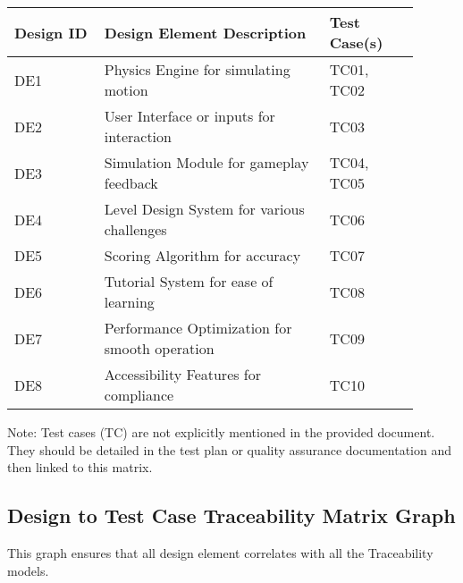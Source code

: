 \documentclass[12pt]{article}
\begin{document}
\begin{longtable}{|p{0.2\linewidth}|p{0.5\linewidth}|p{0.2\linewidth}|}
\hline
\textbf{Design ID} & \textbf{Design Element Description} & \textbf{Test Case(s)} \\
\hline
DE1 & Physics Engine for simulating motion & TC01, TC02 \\
DE2 & User Interface or inputs for interaction & TC03 \\
DE3 & Simulation Module for gameplay feedback & TC04, TC05 \\
DE4 & Level Design System for various challenges & TC06 \\
DE5 & Scoring Algorithm for accuracy & TC07 \\
DE6 & Tutorial System for ease of learning & TC08 \\
DE7 & Performance Optimization for smooth operation & TC09 \\
DE8 & Accessibility Features for compliance & TC10 \\
\hline
\end{longtable}

Note: Test cases (TC) are not explicitly mentioned in the provided document. They should be detailed in the test plan or quality assurance documentation and then linked to this matrix.

\subsection{Design to Test Case Traceability Matrix Graph}
This graph ensures that all design element correlates with all the Traceability models.
\centering
{}
\end{document}
